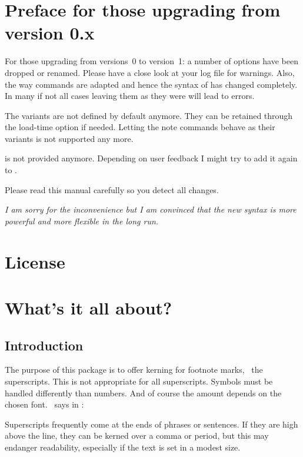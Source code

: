 \documentclass{fnpct-manual}
\begin{document}
\section{Preface for those upgrading from version 0.x}

\begin{bewareofthedog}
  For those upgrading from versions~0 to version~1: a number of options have
  been dropped or renamed. Please have a close look at your log file for
  warnings.  Also, the way commands are adapted and hence the syntax of
   has changed completely. In many if not all cases leaving them
  as they were will lead to errors. \par
  The  variants are not defined by default anymore. They can be
  retained through the load-time option  if needed.  Letting
  the note commands behave as their  variants is not supported
  any more. \par
   is not provided anymore. Depending on user feedback I might
  try to add it again to \fnpct. \par
  Please read this manual carefully so you detect all changes. \par
  \emph{I am sorry for the inconvenience but I am convinced that the new
    syntax is more powerful and more flexible in the long run.}
\end{bewareofthedog}

\section{License}
\license

\section{What's it all about?}
\subsection{Introduction}
The purpose of this package is to offer kerning for footnote marks, \ie\ the
superscripts. This is not appropriate for all superscripts.  Symbols must be
handled differently than numbers.  And of course the amount depends on the
chosen font.  \bringhurst\ says in :

\begin{cnltxquote}
  Superscripts frequently come at the ends of phrases or sentences.  If they
  are high above the line, they can be kerned over a comma or period, but this
  may endanger readability, especially if the text is set in a modest size.
\end{cnltxquote}
\end{document}
